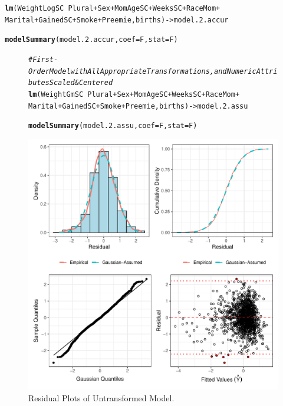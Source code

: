 \documentclass{article}\usepackage[]{graphicx}\usepackage[]{xcolor}
\makeatletter
\def\maxwidth{ %
  \ifdim\Gin@nat@width>\linewidth
    \linewidth
  \else
    \Gin@nat@width
  \fi
}
\newcommand{\hlcom}[1]{\textcolor[rgb]{0.678,0.584,0.686}{\textit{#1}}}%
\newcommand{\hlopt}[1]{\textcolor[rgb]{0,0,0}{#1}}%
\newcommand{\hlstd}[1]{\textcolor[rgb]{0.345,0.345,0.345}{#1}}%
\newcommand{\hlkwb}[1]{\textcolor[rgb]{0.69,0.353,0.396}{#1}}%
\newcommand{\hlkwc}[1]{\textcolor[rgb]{0.333,0.667,0.333}{#1}}%
\newcommand{\hlkwd}[1]{\textcolor[rgb]{0.737,0.353,0.396}{\textbf{#1}}}%
\newenvironment{kframe}{%
 \def\at@end@of@kframe{}%
 \ifinner\ifhmode%
  \def\at@end@of@kframe{\end{minipage}}%
  \begin{minipage}{\columnwidth}%
 \fi\fi%
 \def\FrameCommand##1{\hskip\@totalleftmargin \hskip-\fboxsep
 \colorbox{shadecolor}{##1}\hskip-\fboxsep
     \hskip-\linewidth \hskip-\@totalleftmargin \hskip\columnwidth}%
 \MakeFramed {\advance\hsize-\width
   \@totalleftmargin\z@ \linewidth\hsize
   \@setminipage}}%
 {\par\unskip\endMakeFramed%
 \at@end@of@kframe}
\newenvironment{knitrout}{}{} %
\makeatother
\begin{document}
\begin{knitrout}
\color{fgcolor}\begin{kframe}
\begin{alltt}
\hlkwd{lm}\hlstd{(WeightLogSC} \hlopt{~} \hlstd{Plural} \hlopt{+} \hlstd{Sex} \hlopt{+} \hlstd{MomAgeSC} \hlopt{+} \hlstd{WeeksSC} \hlopt{+} \hlstd{RaceMom} \hlopt{+}
     \hlstd{Marital} \hlopt{+} \hlstd{GainedSC} \hlopt{+} \hlstd{Smoke} \hlopt{+} \hlstd{Preemie, births)} \hlkwb{->} \hlstd{model.2.accur}

\hlkwd{modelSummary}\hlstd{(model.2.accur,} \hlkwc{coef}\hlstd{=F,} \hlkwc{stat}\hlstd{=F)}
\end{alltt}
\end{kframe}
\end{knitrout}

\begin{figure}
\begin{knitrout}
\color{fgcolor}\begin{kframe}
\begin{alltt}
\hlcom{#First-Order Model with All Appropriate Transformations, and Numeric Attributes Scaled & Centered}
\hlkwd{lm}\hlstd{(WeightGmSC} \hlopt{~} \hlstd{Plural} \hlopt{+} \hlstd{Sex} \hlopt{+} \hlstd{MomAgeSC} \hlopt{+} \hlstd{WeeksSC} \hlopt{+} \hlstd{RaceMom} \hlopt{+}
     \hlstd{Marital} \hlopt{+} \hlstd{GainedSC} \hlopt{+} \hlstd{Smoke} \hlopt{+} \hlstd{Preemie, births)} \hlkwb{->} \hlstd{model.2.assu}

\hlkwd{modelSummary}\hlstd{(model.2.assu,} \hlkwc{coef}\hlstd{=F,} \hlkwc{stat}\hlstd{=F)}
\end{alltt}
\end{kframe}
\includegraphics[width=\maxwidth]{figure/unnamed-chunk-13-1} 
\end{knitrout}
\caption{Residual Plots of Untransformed Model.} 
\label{resid.plots.un}
\end{figure}
\end{document}
